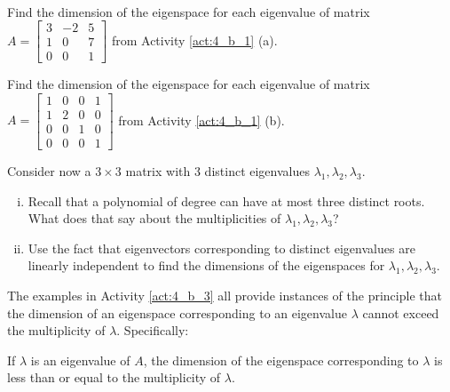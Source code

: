 \begin{activity} \label{act:4_b_3} ~
	
	\ba
	\item Find the dimension of the eigenspace for each eigenvalue of matrix $A = \left[ \begin{array}{crc} 3&-2&5 \\ 1&0&7 \\ 0&0&1 \end{array} \right]$ from Activity \ref{act:4_b_1} (a). 
	

	
	\item Find the dimension of the eigenspace for each eigenvalue of matrix $A=\left[ \begin{array}{cccc} 1&0&0&1\\ 1&2&0&0 \\ 0&0&1&0 \\ 0&0&0&1 \end{array} \right]$ from Activity \ref{act:4_b_1} (b).



 \item Consider now a $3\times 3$ matrix with 3 distinct eigenvalues $\lambda_1, \lambda_2, \lambda_3$. 

\begin{enumerate}[i.]
\item Recall that a polynomial of degree can have at most three distinct roots. What does that say about the multiplicities of $\lambda_1, \lambda_2, \lambda_3$?



\item Use the fact that eigenvectors corresponding to distinct eigenvalues are linearly independent to find the dimensions of the eigenspaces for $\lambda_1, \lambda_2, \lambda_3$.

\end{enumerate}



	\ea
\end{activity}



The examples in Activity \ref{act:4_b_3} all provide instances of the principle that the dimension of an eigenspace corresponding to an eigenvalue $\lambda$ cannot exceed the multiplicity of $\lambda$. Specifically:



\begin{theorem} If $\lambda$ is an eigenvalue of $A$, the dimension of the eigenspace corresponding to $\lambda$ is less than or equal to the multiplicity of $\lambda$.
\end{theorem}



